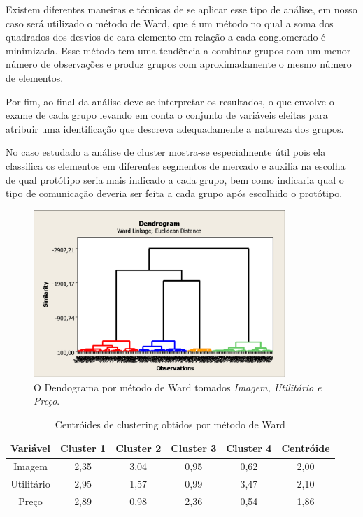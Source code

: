 Existem diferentes maneiras e técnicas de se aplicar esse tipo de
análise, em nosso caso será utilizado o método de Ward, que é um método
no qual a soma dos quadrados dos desvios de cara elemento em relação
a cada conglomerado é minimizada. Esse método tem uma tendência a
combinar grupos com um menor número de observações e produz grupos
com aproximadamente o mesmo número de elementos.

Por fim, ao final da análise deve-se interpretar os resultados, o
que envolve o exame de cada grupo levando em conta o conjunto de variáveis
eleitas para atribuir uma identificação que descreva adequadamente
a natureza dos grupos.

No caso estudado a análise de cluster mostra-se especialmente útil
pois ela classifica os elementos em diferentes segmentos de mercado
e auxilia na escolha de qual protótipo seria mais indicado a cada
grupo, bem como indicaria qual o tipo de comunicação deveria ser feita
a cada grupo após escolhido o protótipo.

\begin{figure}
\begin{centering}
\includegraphics[width=0.85\textwidth]{Imagens/dendogram}
\par\end{centering}

\caption{\label{fig:dendogram}O Dendograma por método de Ward tomados \emph{Imagem,
Utilitário e Preço}.}
\end{figure}


\begin{table}
\begin{centering}
\begin{tabular}{c|c|c|c|c|c}
\hline 
Variável & Cluster 1 & Cluster 2 & Cluster 3 & Cluster 4 & Centróide\tabularnewline
\hline 
Imagem & 2,35 & 3,04 & 0,95 & 0,62 & 2,00\tabularnewline
\hline 
Utilitário & 2,95 & 1,57 & 0,99 & 3,47 & 2,10\tabularnewline
\hline 
Preço & 2,89 & 0,98 & 2,36 & 0,54 & 1,86\tabularnewline
\hline 
\end{tabular}
\par\end{centering}

\caption{\label{tab:centroids-ward}Centróides de clustering obtidos por método
de Ward}
\end{table}


